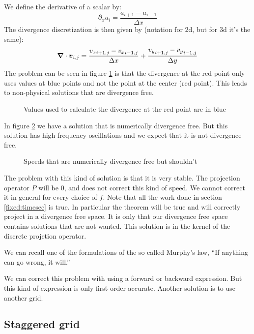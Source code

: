 We define the derivative of a scalar by:
\begin{equation}
  \partial_x a_i=\frac{a_{i+1}-a_{i-1}}{\Delta x}
\end{equation}
The divergence discretization is then given by (notation for 2d, but for 3d it's the same):
\begin{equation}
  {\boldsymbol {\nabla}} \cdot {\boldsymbol {v}}_{i,j}=\frac{{v_{x}}_{i+1,j}-{v_{x}}_{i-1,j}}{\Delta x}+\frac{{v_{y}}_{i+1,j}-{v_{y}}_{i-1,j}}{\Delta y}
\end{equation}
The problem can be seen in figure \ref{fixed:unstaggered_div} is that the divergence at the red point only uses values at blue points and not the point at the center (red point).
This leads to  non-physical solutions that are divergence free.

\begin{figure}
\caption{Values used to calculate the divergence at the red point are in blue}
\label{fixed:unstaggered_div}
\end{figure}

In figure \ref{fixed:unstaggered_div2} we have a solution that is numerically divergence free.
But this solution has high frequency oscillations and we expect that it is not divergence free.

\begin{figure}
\caption{Speeds that are numerically divergence free but shouldn't}
\label{fixed:unstaggered_div2}
\end{figure}

The problem with this kind of solution is that it is very stable.
The projection operator $P$ will be 0, and does not correct this kind of speed. We cannot correct it in general for every choice of $f$.
Note that all the work done in section \ref{fixed:timesec} is true. In particular the theorem will be true and will correctly project
in a divergence free space. It is only that our divergence free space contains solutions that are not wanted.
This solution is in the kernel of the discrete projetion operator.

We can recall one of the formulations of the so called Murphy's law, ``If anything can go wrong, it will.''

We can correct this problem with using a forward or backward expression. But this kind of expression is only first order accurate.
Another solution is to use another grid.

\FloatBarrier
\subsection{Staggered grid}

